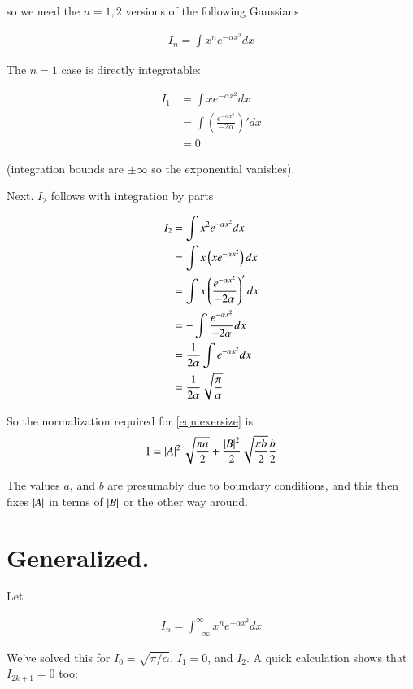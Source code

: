 \documentclass{article}
\begin{document}
so we need the $n=1,2$ versions of the following Gaussians

\begin{align*}
I_n = \int x^n e^{-\alpha x^2} dx
\end{align*}

The $n=1$ case is directly integratable:

\begin{align*}
I_1 
&= \int x e^{-\alpha x^2} dx \\
&= \int \left(\frac{e^{-\alpha x^2}}{-2\alpha}\right)' dx \\
&= 0
\end{align*}

(integration bounds are $\pm \infty$ so the exponential vanishes).

Next.  $I_2$ follows with integration by parts

\begin{align*}
I_2 
&= \int x^2 e^{-\alpha x^2} dx \\
&= \int x \left(x e^{-\alpha x^2}\right) dx \\
&= \int x \left(\frac{e^{-\alpha x^2}}{-2\alpha}\right)' dx \\
&= -\int \frac{e^{-\alpha x^2}}{-2\alpha} dx \\
&= \frac{1}{2\alpha}\int e^{-\alpha x^2} dx \\
&= \frac{1}{2\alpha} \sqrt{\frac{\pi}{\alpha}}
\end{align*}

So the normalization required for \ref{eqn:exersize} is
\begin{align*}
1 = \left\lvert{A}\right\rvert^2 \sqrt{\frac{\pi a}{2}} + \frac{\left\lvert{B}\right\rvert^2}{2} 
\sqrt{\frac{\pi b}{2}} \frac{b}{2}
\end{align*}

The values $a$, and $b$ are presumably due to boundary conditions, and this then fixes $\left\lvert{A}\right\rvert$ in terms of $\left\lvert{B}\right\rvert$ or the other way around.

\section{ Generalized. }

Let 

\begin{align}
I_n = \int_{-\infty}^\infty x^n e^{-\alpha x^2} dx
\end{align}

We've solved this for $I_0 = \sqrt{\pi/\alpha}$, $I_1 = 0$, and $I_2$.  A quick calculation shows that $I_{2k+1} = 0$ too:
\end{document}
